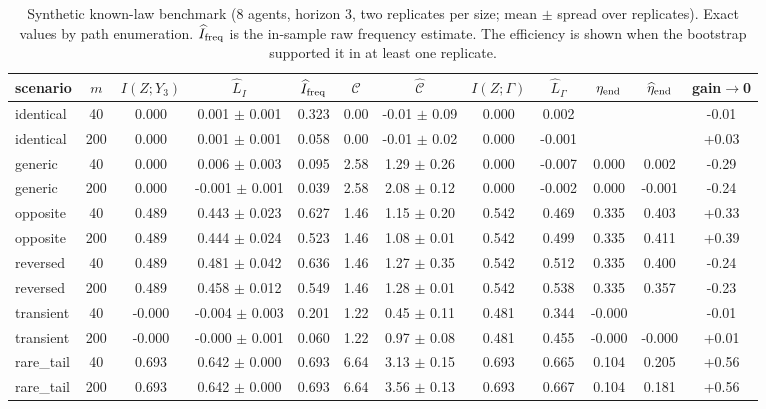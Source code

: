 \begin{table}[htbp]
\centering
\scriptsize
\caption{Synthetic known-law benchmark (8 agents, horizon 3, two replicates per size; mean $\pm$ spread over replicates). Exact values by path enumeration. $\widehat I_{\rm freq}$ is the in-sample raw frequency estimate. The efficiency is shown when the bootstrap supported it in at least one replicate.}\label{tab:synthetic}
\begin{tabular}{l c cc c cc cc cc c}
\toprule
scenario & $m$ & $I(Z;Y_3)$ & $\widehat L_I$ & $\widehat I_{\rm freq}$ & $\mathcal C$ & $\widehat{\mathcal C}$ & $I(Z;\Gamma)$ & $\widehat L_\Gamma$ & $\eta_{\rm end}$ & $\widehat\eta_{\rm end}$ & gain$\to$0 \\
\midrule
identical & 40 & 0.000 & 0.001 $\pm$ 0.001 & 0.323 & 0.00 & -0.01 $\pm$ 0.09 & 0.000 & 0.002 &  &  & -0.01 \\
identical & 200 & 0.000 & 0.001 $\pm$ 0.001 & 0.058 & 0.00 & -0.01 $\pm$ 0.02 & 0.000 & -0.001 &  &  & +0.03 \\
generic & 40 & 0.000 & 0.006 $\pm$ 0.003 & 0.095 & 2.58 & 1.29 $\pm$ 0.26 & 0.000 & -0.007 & 0.000 & 0.002 & -0.29 \\
generic & 200 & 0.000 & -0.001 $\pm$ 0.001 & 0.039 & 2.58 & 2.08 $\pm$ 0.12 & 0.000 & -0.002 & 0.000 & -0.001 & -0.24 \\
opposite & 40 & 0.489 & 0.443 $\pm$ 0.023 & 0.627 & 1.46 & 1.15 $\pm$ 0.20 & 0.542 & 0.469 & 0.335 & 0.403 & +0.33 \\
opposite & 200 & 0.489 & 0.444 $\pm$ 0.024 & 0.523 & 1.46 & 1.08 $\pm$ 0.01 & 0.542 & 0.499 & 0.335 & 0.411 & +0.39 \\
reversed & 40 & 0.489 & 0.481 $\pm$ 0.042 & 0.636 & 1.46 & 1.27 $\pm$ 0.35 & 0.542 & 0.512 & 0.335 & 0.400 & -0.24 \\
reversed & 200 & 0.489 & 0.458 $\pm$ 0.012 & 0.549 & 1.46 & 1.28 $\pm$ 0.01 & 0.542 & 0.538 & 0.335 & 0.357 & -0.23 \\
transient & 40 & -0.000 & -0.004 $\pm$ 0.003 & 0.201 & 1.22 & 0.45 $\pm$ 0.11 & 0.481 & 0.344 & -0.000 &  & -0.01 \\
transient & 200 & -0.000 & -0.000 $\pm$ 0.001 & 0.060 & 1.22 & 0.97 $\pm$ 0.08 & 0.481 & 0.455 & -0.000 & -0.000 & +0.01 \\
rare\_tail & 40 & 0.693 & 0.642 $\pm$ 0.000 & 0.693 & 6.64 & 3.13 $\pm$ 0.15 & 0.693 & 0.665 & 0.104 & 0.205 & +0.56 \\
rare\_tail & 200 & 0.693 & 0.642 $\pm$ 0.000 & 0.693 & 6.64 & 3.56 $\pm$ 0.13 & 0.693 & 0.667 & 0.104 & 0.181 & +0.56 \\
\bottomrule
\end{tabular}
\end{table}